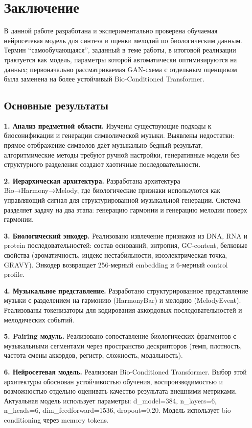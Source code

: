 \chapter*{Заключение}

В данной работе разработана и экспериментально проверена обучаемая нейросетевая модель для синтеза и оценки мелодий по биологическим данным. Термин ``самообучающаяся'', заданный в теме работы, в итоговой реализации трактуется как модель, параметры которой автоматически оптимизируются на данных; первоначально рассматриваемая GAN-схема с отдельным оценщиком была заменена на более устойчивый Bio-Conditioned Transformer.

\section*{Основные результаты}

\textbf{1. Анализ предметной области.} Изучены существующие подходы к биосонификации и генерации символической музыки. Выявлены недостатки: прямое отображение символов даёт музыкально бедный результат, алгоритмические методы требуют ручной настройки, генеративные модели без структурного разделения создают хаотичные последовательности.

\textbf{2. Иерархическая архитектура.} Разработана архитектура Bio→Harmony→Melody, где биологические признаки используются как управляющий сигнал для структурированной музыкальной генерации. Система разделяет задачу на два этапа: генерацию гармонии и генерацию мелодии поверх гармонии.

\textbf{3. Биологический энкодер.} Реализовано извлечение признаков из DNA, RNA и protein последовательностей: состав оснований, энтропия, GC-content, белковые свойства (ароматичность, индекс нестабильности, изоэлектрическая точка, GRAVY). Энкодер возвращает 256-мерный embedding и 6-мерный control profile.

\textbf{4. Музыкальное представление.} Разработано структурированное представление музыки с разделением на гармонию (HarmonyBar) и мелодию (MelodyEvent). Реализованы токенизаторы для кодирования аккордовых последовательностей и мелодических событий.

\textbf{5. Pairing модуль.} Реализовано сопоставление биологических фрагментов с музыкальными сегментами через пространство дескрипторов (темп, плотность, частота смены аккордов, регистр, сложность, модальность).

\textbf{6. Нейросетевая модель.} Реализован Bio-Conditioned Transformer. Выбор этой архитектуры обоснован устойчивостью обучения, воспроизводимостью и возможностью отдельно оценивать качество результата внешними метриками. Актуальная модель использует параметры: d\_model=384, n\_layers=6, n\_heads=6, dim\_feedforward=1536, dropout=0.20. Модель использует bio conditioning через memory tokens.

